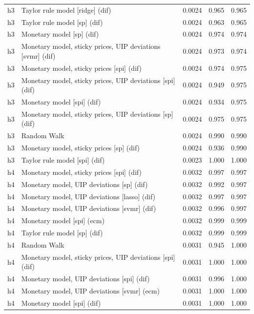 \begin{ThreePartTable}
\begin{longtable}[t]{cp{5.5cm}ccc}
h3 & \raggedright Taylor rule model [ridge] (dif) & 0.0024 & 0.965 & 0.965\\
h3 & \raggedright Taylor rule model [sp] (dif) & 0.0024 & 0.963 & 0.965\\
h3 & \raggedright Monetary model [sp] (dif) & 0.0024 & 0.974 & 0.974\\
h3 & \raggedright Monetary model, sticky prices, UIP deviations [svmr] (dif) & 0.0024 & 0.973 & 0.974\\
h3 & \raggedright Monetary model, sticky prices [spi] (dif) & 0.0024 & 0.974 & 0.975\\
h3 & \raggedright Monetary model, sticky prices, UIP deviations [spi] (dif) & 0.0024 & 0.949 & 0.975\\
h3 & \raggedright Monetary model [spi] (dif) & 0.0024 & 0.934 & 0.975\\
h3 & \raggedright Monetary model, sticky prices, UIP deviations [sp] (dif) & 0.0024 & 0.975 & 0.975\\
h3 & \raggedright Random Walk & 0.0024 & 0.990 & 0.990\\
h3 & \raggedright Monetary model, sticky prices [sp] (dif) & 0.0024 & 0.936 & 0.990\\
h3 & \raggedright Taylor rule model [spi] (dif) & 0.0023 & 1.000 & 1.000\\
\addlinespace
h4 & \raggedright Monetary model, sticky prices [spi] (dif) & 0.0032 & 0.997 & 0.997\\
h4 & \raggedright Monetary model, UIP deviations [sp] (dif) & 0.0032 & 0.992 & 0.997\\
h4 & \raggedright Monetary model, UIP deviations [lasso] (dif) & 0.0032 & 0.997 & 0.997\\
h4 & \raggedright Monetary model, UIP deviations [svmr] (dif) & 0.0032 & 0.996 & 0.997\\
h4 & \raggedright Monetary model [spi] (ecm) & 0.0032 & 0.999 & 0.999\\
h4 & \raggedright Taylor rule model [sp] (dif) & 0.0032 & 0.999 & 0.999\\
h4 & \raggedright Random Walk & 0.0031 & 0.945 & 1.000\\
h4 & \raggedright Monetary model, sticky prices, UIP deviations [spi] (dif) & 0.0031 & 1.000 & 1.000\\
h4 & \raggedright Monetary model, UIP deviations [spi] (dif) & 0.0031 & 0.996 & 1.000\\
h4 & \raggedright Monetary model, UIP deviations [svmr] (ecm) & 0.0031 & 1.000 & 1.000\\
h4 & \raggedright Monetary model [spi] (dif) & 0.0031 & 1.000 & 1.000\\

\end{longtable}
\end{ThreePartTable}

